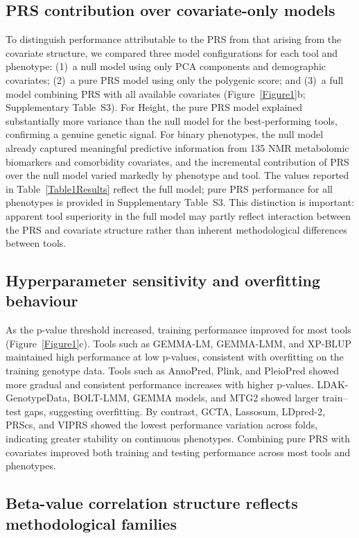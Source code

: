 \documentclass[pdflatex,sn-basic]{sn-jnl}
\begin{document}
\subsection*{PRS contribution over covariate-only models}

To distinguish performance attributable to the PRS from that arising from the covariate structure, we compared three model configurations for each tool and phenotype: (1)~a null model using only PCA components and demographic covariates; (2)~a pure PRS model using only the polygenic score; and (3)~a full model combining PRS with all available covariates (Figure~\ref{Figure1}b; Supplementary Table~S3). For Height, the pure PRS model explained substantially more variance than the null model for the best-performing tools, confirming a genuine genetic signal. For binary phenotypes, the null model already captured meaningful predictive information from 135 NMR metabolomic biomarkers and comorbidity covariates, and the incremental contribution of PRS over the null model varied markedly by phenotype and tool. The values reported in Table~\ref{Table1Results} reflect the full model; pure PRS performance for all phenotypes is provided in Supplementary Table~S3. This distinction is important: apparent tool superiority in the full model may partly reflect interaction between the PRS and covariate structure rather than inherent methodological differences between tools.

\subsection*{Hyperparameter sensitivity and overfitting behaviour}

As the p-value threshold increased, training performance improved for most tools (Figure~\ref{Figure1}c). Tools such as GEMMA-LM, GEMMA-LMM, and XP-BLUP maintained high performance at low p-values, consistent with overfitting on the training genotype data. Tools such as AnnoPred, Plink, and PleioPred showed more gradual and consistent performance increases with higher p-values. LDAK-GenotypeData, BOLT-LMM, GEMMA models, and MTG2 showed larger train--test gaps, suggesting overfitting. By contrast, GCTA, Lassosum, LDpred-2, PRScs, and VIPRS showed the lowest performance variation across folds, indicating greater stability on continuous phenotypes. Combining pure PRS with covariates improved both training and testing performance across most tools and phenotypes.

\subsection*{Beta-value correlation structure reflects methodological families}
\end{document}
